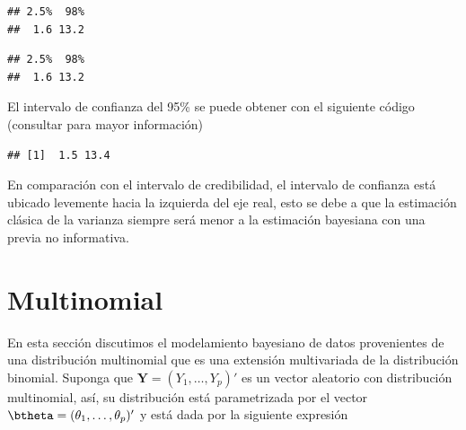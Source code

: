 \begin{Eje}
\begin{knitrout}
\begin{kframe}
\begin{verbatim}
## 2.5%  98% 
##  1.6 13.2
\end{verbatim}
\end{kframe}
\end{knitrout}
\begin{knitrout}
\color{fgcolor}\begin{kframe}
\begin{alltt}
\hlstd{(Sigma.pos[,}\hlstd{,}\hlstd{],} \hlstd{(}\hlstd{,}\hlstd{))}
\end{alltt}
\begin{verbatim}
## 2.5%  98% 
##  1.6 13.2
\end{verbatim}
\end{kframe}
\end{knitrout}
El intervalo de confianza del 95\% se puede obtener con el siguiente código (consultar  para mayor información)
\begin{knitrout}
\color{fgcolor}\begin{kframe}
\begin{alltt}
\hlstd{(}\hlopt{*}\hlstd{(y[,}\hlstd{])}\hlopt{/}\hlstd{(}\hlstd{,}\hlstd{),} \hlopt{*}\hlstd{(y[,}\hlstd{])}\hlopt{/}\hlstd{(}\hlstd{,}\hlstd{))}
\end{alltt}
\begin{verbatim}
## [1]  1.5 13.4
\end{verbatim}
\end{kframe}
\end{knitrout}
En comparación con el intervalo de credibilidad, el intervalo de confianza está ubicado levemente hacia la izquierda del eje real, esto se debe a que la estimación clásica de la varianza siempre será menor a la estimación bayesiana con una previa no informativa.
\end{Eje}
  
\section{Multinomial}
En esta sección discutimos el modelamiento bayesiano de datos provenientes de una distribución multinomial que es una extensión multivariada de la distribución binomial. Suponga que $\textbf{Y}=(Y_1,\ldots,Y_p)'$ es un vector aleatorio con distribución multinomial, así, su distribución está parametrizada por el vector $\btheta=(\theta_1,\ldots,\theta_p)'$ y está dada por la siguiente expresión
  

